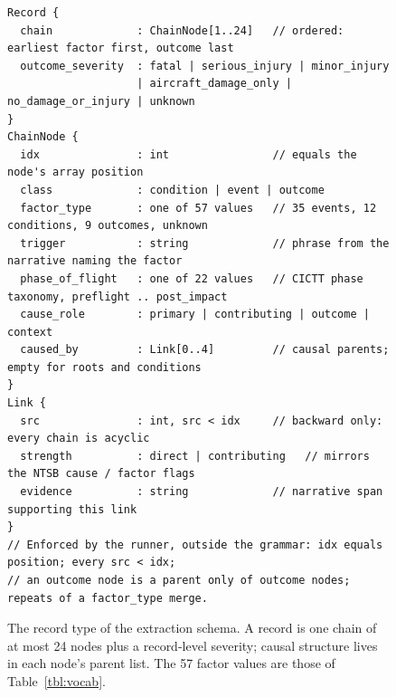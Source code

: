 \begin{figure}[H]
\centering
\begin{lstlisting}[style=schema]
Record {
  chain             : ChainNode[1..24]   // ordered: earliest factor first, outcome last
  outcome_severity  : fatal | serious_injury | minor_injury
                    | aircraft_damage_only | no_damage_or_injury | unknown
}
ChainNode {
  idx               : int                // equals the node's array position
  class             : condition | event | outcome
  factor_type       : one of 57 values   // 35 events, 12 conditions, 9 outcomes, unknown
  trigger           : string             // phrase from the narrative naming the factor
  phase_of_flight   : one of 22 values   // CICTT phase taxonomy, preflight .. post_impact
  cause_role        : primary | contributing | outcome | context
  caused_by         : Link[0..4]         // causal parents; empty for roots and conditions
}
Link {
  src               : int, src < idx     // backward only: every chain is acyclic
  strength          : direct | contributing   // mirrors the NTSB cause / factor flags
  evidence          : string             // narrative span supporting this link
}
// Enforced by the runner, outside the grammar: idx equals position; every src < idx;
// an outcome node is a parent only of outcome nodes; repeats of a factor_type merge.
\end{lstlisting}
\caption{The record type of the extraction schema. A record is one chain
of at most 24 nodes plus a record-level severity; causal structure lives in
each node's parent list. The 57 factor values are those of
Table~\ref{tbl:vocab}.}
\label{fig:schema}
\end{figure}

